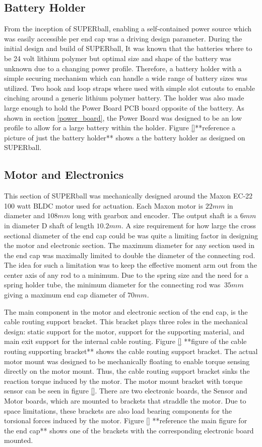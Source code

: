 \subsection{Battery Holder}
\label{battery_holder}
From the inception of SUPERball, enabling a self-contained power source which was easily accessible per end cap was a driving design parameter.
During the initial design and build of SUPERball, It was known that the batteries where to be 24 volt lithium polymer but optimal size and shape of the battery was unknown due to a changing power profile.
Therefore, a battery holder with a simple securing mechanism which can handle a wide range of battery sizes was utilized.
Two hook and loop straps where used with simple slot cutouts to enable cinching around a generic lithium polymer battery.
The holder was also made large enough to hold the Power Board PCB board opposite of the battery.
As shown in section \ref{power_board}, the Power Board was designed to be an low profile to allow for a large battery within the holder.
Figure \ref{}**reference a picture of just the battery holder** shows a the battery holder as designed on SUPERball.

\subsection{Motor and Electronics}
\label{mechanical:motor}
This section of SUPERball was mechanically designed around the Maxon EC-22 100 watt BLDC motor used for actuation. 
Each Maxon motor is \(22 mm\) in diameter and \(108 mm\) long with gearbox and encoder.
The output shaft is a \(6 mm\) in diameter D shaft of length \(10.2 mm\).
A size requirement for how large the cross sectional diameter of the end cap could be was quite a limiting factor in designing the motor and electronic section.
The maximum diameter for any section used in the end cap was maximally limited to double the diameter of the connecting rod.
The idea for such a limitation was to keep the effective moment arm out from the center axis of any rod to a minimum.  
Due to the spring size and the need for a spring holder tube, the minimum diameter for the connecting rod was \(~35mm\) giving a maximum end cap diameter of \(70mm\).

The main component in the motor and electronic section of the end cap, is the cable routing support bracket. 
This bracket plays three roles in the mechanical design: static support for the motor, support for the supporting material, and main exit support for the internal cable routing.
Figure \ref{} **figure of the cable routing supporting bracket** shows the cable routing support bracket.
The actual motor mount was designed to be mechanically floating to enable torque sensing directly on the motor mount.
Thus, the cable routing support bracket sinks the reaction torque induced by the motor.
The motor mount bracket with torque sensor can be seen in figure \ref{}.
There are two electronic boards, the Sensor and Motor boards, which are mounted to brackets that straddle the motor.
Due to space limitations, these brackets are also load bearing components for the torsional forces induced by the motor.
Figure \ref{} **reference the main figure for the end cap** shows one of the brackets with the corresponding electronic board mounted.

